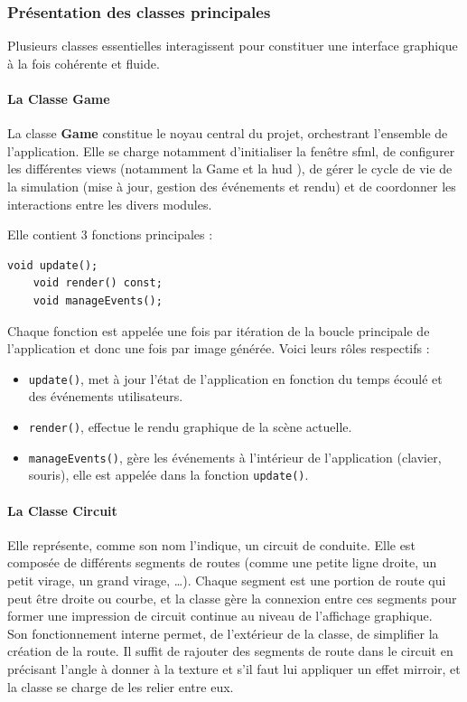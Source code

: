 \subsubsection{Présentation des classes principales}\label{subsubsec:presentation-des-classes-principales}
Plusieurs classes essentielles interagissent pour constituer une interface graphique à la fois cohérente et fluide.

\paragraph[Game]{La Classe \textbf{Game}}\label{par:class_game}
La classe \textbf{Game} constitue le noyau central du projet, orchestrant l'ensemble de l'application.
Elle se charge notamment d'initialiser la fenêtre \gls{sfml}, de configurer les différentes \glspl{view} (notamment la Game  et la \gls{hud} ), de gérer le cycle de vie de la simulation (mise à jour, gestion des événements et rendu) et de coordonner les interactions entre les divers modules.

Elle contient 3 fonctions principales :
\begin{lstlisting}[style=CStyle, label={lst:game_class}]
    void update();
    void render() const;
    void manageEvents();
\end{lstlisting}
Chaque fonction est appelée une fois par itération de la boucle principale de l'application et donc une fois par image générée.
Voici leurs rôles respectifs :
\begin{itemize}
    \item \texttt{update()}, met à jour l'état de l'application en fonction du temps écoulé et des événements utilisateurs.
    \item \texttt{render()}, effectue le rendu graphique de la scène actuelle.
    \item \texttt{manageEvents()}, gère les événements à l'intérieur de l'application (clavier, souris), elle est appelée dans la fonction \texttt{update()}.
\end{itemize}

\paragraph[Circuit]{La Classe \textbf{Circuit}}
Elle représente, comme son nom l'indique, un circuit de conduite.
Elle est composée de différents segments de routes (comme une petite ligne droite, un petit virage, un grand virage, \dots).
Chaque segment est une portion de route qui peut être droite ou courbe, et la classe gère la connexion entre ces segments pour former une impression de circuit continue au niveau de l'affichage graphique. \\
Son fonctionnement interne permet, de l'extérieur de la classe, de simplifier la création de la route.
Il suffit de rajouter des segments de route dans le circuit en précisant l'angle à donner à la texture et s'il faut lui appliquer un effet mirroir, et la classe se charge de les relier entre eux.

